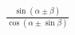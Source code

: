 \documentclass[preview]{standalone}
\begin{document}
\begin{align*}
\frac{\sin(\alpha\pm\beta)}{\cos(\alpha\pm\sin\beta)}
\end{align*}
\end{document}
